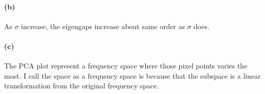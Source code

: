 \documentclass{article}
\begin{document}
\newpage
\paragraph{(b)}
As $\sigma$ increase, the eigengaps increase about same order as $\sigma$ does.
\begin{figure}
  \centering
  \qquad
  \qquad
\end{figure}


\paragraph{(c)}
The PCA plot represent a frequency space where those pixel points varies the most. I call the space as a frequency space is because that the subspace is a linear transformation from the original frequency space.
\begin{figure}[h]
  \centering
\end{figure}
\end{document}
